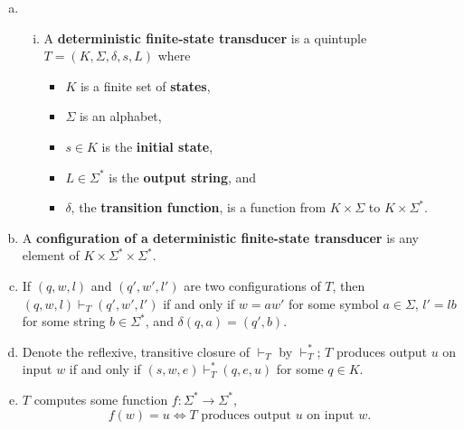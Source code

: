 \documentclass{article}
\begin{document}
\begin{enumerate}[(a)]
\begin{enumerate}[(i)]
  \end{enumerate}
\item \begin{enumerate}[(i)]
  \item A \textbf{deterministic finite-state transducer} is a quintuple $T = (K,
    \Sigma, \delta, s, L)$ where \begin{itemize}[label={}]
    \item $K$ is a finite set of \textbf{states},
    \item $\Sigma$ is an alphabet,
    \item $s \in K$ is the \textbf{initial state},
    \item $L \in \Sigma^*$ is the \textbf{output string}, and
    \item $\delta$, the \textbf{transition function}, is a function from $K
      \times \Sigma$ to $K \times \Sigma^*$.
    \end{itemize}
  \end{enumerate}
  \item A \textbf{configuration of a deterministic finite-state transducer} is
    any element of $K \times \Sigma^* \times \Sigma^*$.
  \item If $(q, w, l)$ and $(q', w', l')$ are two configurations of $T$, then
    $(q, w, l) \vdash_T (q', w', l')$ if and only if $w = aw'$ for some symbol
    $a \in \Sigma$, $l' = lb$ for some string $b \in \Sigma^*$, and
    $\delta(q, a) = (q', b)$.
  \item Denote the reflexive, transitive closure of $\vdash_T$ by $\vdash_T^*$;
    $T$ produces output $u$ on input $w$ if and only if $(s, w, e) \vdash_T^*
    (q, e, u)$ for some $q \in K$.
  \item $T$ computes some function $f: \Sigma^* \to \Sigma^*$, \[
      f(w) = u \iff T\text{ produces output }u\text{ on input }w.
    \]
\end{enumerate}
\end{document}
